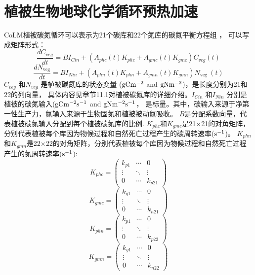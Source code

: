 \section{植被生物地球化学循环预热加速}
CoLM植被碳氮循环可以表示为21个碳库和22个氮库的碳氮平衡方程组 \citep{lu2020full}，
可以写成矩阵形式：
\begin{equation}
\frac{d C_{veg}}{dt}=B I_{Cin}+\left(A_{p h c}(t) K_{p h c}+A_{gmc}(t) K_{gmc}\right) C_{veg}(t)
\end{equation}
\begin{equation}
\frac{d N_{\text {veg}}}{dt}=B I_{Nin}+\left(A_{phn}(t) K_{phn}+A_{gmn}(t) K_{gmn}\right) N_{\text {veg }}(t)
\end{equation}
$C_{veg}$ 和$N_{veg}$ 是植被碳氮库的状态变量 ($\rm g C m^{-2}$ and $\rm g N m^{-2}$)，是长度分别为21和22的列向量，
具体内容见章节11.1对植被碳氮库的详细介绍。$I_{Cin}$ 和$I_{Nin}$ 分别是植被的碳氮输入($\rm g C m^{-2} s^{-1}$ and $\rm g N m^{-2} s^{-1}$，
是标量。其中，碳输入来源于净第一性生产力，氮输入来源于生物固氮和植被被动氮吸收。
$B$是分配系数向量，代表植被碳氮输入分配到每个植被碳氮库的比例.  
$K_{phc}$和$K_{gmc}$是21$\times$21的对角矩阵，分别代表植被每个库因为物候过程和自然死亡过程产生的碳周转速率($\rm s^{-1}$)。
$K_{phn}$和$K_{gmn}$是22$\times$22的对角矩阵，分别代表植被每个库因为物候过程和自然死亡过程产生的氮周转速率($\rm s^{-1}$):
\begin{equation}
K_{p h c}=\left(\begin{array}{ccc}k_{p 1} & \cdots & 0 \\ \vdots & \ddots & \vdots \\ 0 & \cdots & k_{p 21}\end{array}\right)
\end{equation}
\begin{equation}
K_{gmc}=\left(\begin{array}{ccc}k_{g 1} & \cdots & 0 \\ \vdots & \ddots & \vdots \\ 0 & \cdots & k_{n 21}\end{array}\right)
\end{equation}
\begin{equation}
K_{phn}=\left(\begin{array}{ccc}k_{p 1} & \cdots & 0 \\ \vdots & \ddots & \vdots \\ 0 & \cdots & k_{p 22}\end{array}\right)
\end{equation}
\begin{equation}
K_{gmn}=\left(\begin{array}{ccc}k_{g 1} & \cdots & 0 \\ \vdots & \ddots & \vdots \\ 0 & \cdots & k_{n 22}\end{array}\right)
\end{equation}
